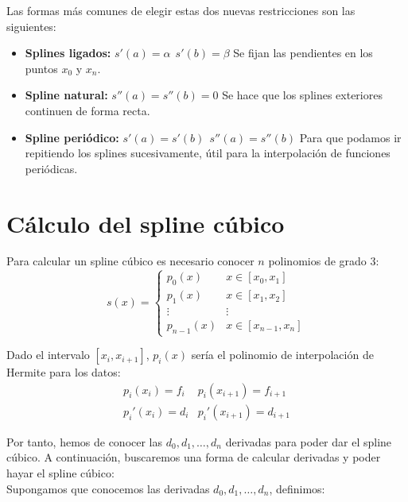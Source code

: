 \noindent
Las formas más comunes de elegir estas dos nuevas restricciones son las siguientes:

\begin{itemize}
    \item \textbf{Splines ligados:} $s'(a) = \alpha~~s'(b)=\beta$
          Se fijan las pendientes en los puntos $x_0$ y $x_n$.

    \item \textbf{Spline natural:} $s''(a) = s''(b) = 0$
          Se hace que los splines exteriores continuen de forma recta.

    \item \textbf{Spline periódico:} $s'(a) = s'(b)~~s''(a)=s''(b)$
          Para que podamos ir repitiendo los splines sucesivamente, útil para la
          interpolación de funciones periódicas.
\end{itemize}

\section{Cálculo del spline cúbico}

\bigskip
\noindent
Para calcular un spline cúbico es necesario conocer $n$ polinomios de grado 3:
$$s(x) = \left\{ \begin{array}{ll}
        p_0(x)     & x \in [x_0, x_1]     \\
        p_1(x)     & x \in [x_1, x_2]     \\
        \vdots     & \vdots               \\
        p_{n-1}(x) & x \in [x_{n-1}, x_n]
    \end{array} \right.$$

\noindent
Dado el intervalo $[x_i, x_{i+1}]$, $p_i(x)$ sería el polinomio de interpolación de Hermite para
los datos:
$$\begin{array}{cc}
        p_i(x_i) = f_i  & p_i(x_{i+1}) = f_{i+1}  \\
        p_i'(x_i) = d_i & p_i'(x_{i+1}) = d_{i+1}
    \end{array}$$

\bigskip
\noindent
Por tanto, hemos de conocer las $d_0, d_1, \ldots, d_n$ derivadas para poder dar el spline cúbico.
A continuación, buscaremos una forma de calcular derivadas y poder hayar
el spline cúbico:\\

\noindent
Supongamos que conocemos las derivadas $d_0, d_1, \ldots, d_n$, definimos:\\

